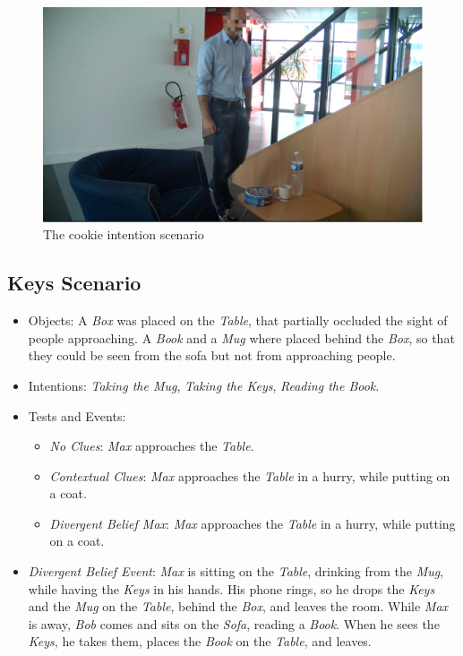  \begin{figure}[ht!]
	\centering
	\includegraphics[scale=0.5]{img/observer/cookie1-blur.pdf}
	\caption{The cookie intention scenario}
	\label{fig:observer_experiments-cookie}
\end{figure}


\subsection{Keys Scenario}
\begin{itemize}
\item Objects: A \textit{Box} was placed on the \textit{Table}, that partially occluded the sight of people approaching. A \textit{Book} and a \textit{Mug} where placed behind the \textit{Box}, so that they could be seen from the sofa but not from approaching people.
\item Intentions: \textit{Taking the Mug}, \textit{Taking the Keys}, \textit{Reading the Book}.
\item Tests and Events:
\begin{itemize}
\item \textit{No Clues}: \textit{Max} approaches the \textit{Table}.
\item\textit{Contextual Clues}: \textit{Max} approaches the \textit{Table} in a hurry, while putting on a coat.
\item \textit{Divergent Belief Max}: \textit{Max} approaches the \textit{Table} in a hurry, while putting on a coat.
\end{itemize}
\item \textit{Divergent Belief Event}: \textit{Max} is sitting on the \textit{Table}, drinking from the \textit{Mug}, while having the \textit{Keys} in his hands. His phone rings, so he drops the \textit{Keys} and the \textit{Mug} on the \textit{Table}, behind the \textit{Box}, and leaves the room. While \textit{Max} is away, \textit{Bob} comes and sits on the \textit{Sofa}, reading a \textit{Book}. When he sees the \textit{Keys}, he takes them, places the \textit{Book} on the \textit{Table}, and leaves.
\end{itemize}

